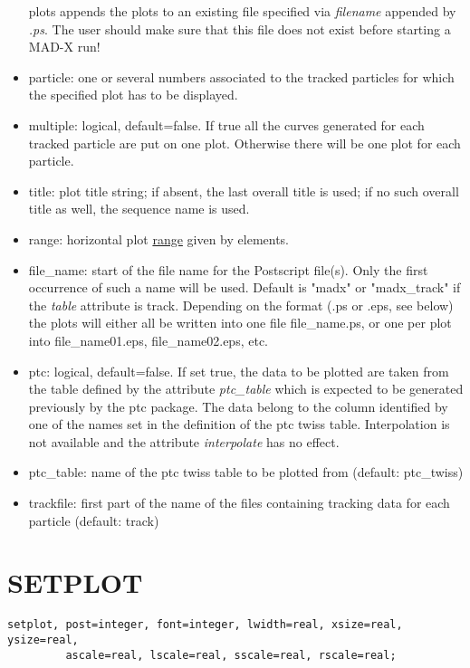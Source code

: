 \begin{itemize}
     plots appends the plots to an existing file specified via
     \textit{filename} appended by \textit{.ps}. The user should make
     sure that this file does not exist before starting a MAD-X run! 
   \item particle: one or several numbers associated to the tracked
     particles for which the specified plot has to be displayed.  
   \item multiple: logical, default=false. If true all the curves
     generated for each tracked particle are put on one plot. Otherwise
     there will be one plot for each particle.   
   \item title: plot title string; if absent, the last overall title is
     used; if no such overall title as well, the sequence name is used.   
   \item range: horizontal plot
     \href{../Introduction/ranges.html}{range} given by elements.  
   \item file\_name: start of the file name for the Postscript
     file(s). Only the first occurrence of such a name will be
     used. Default is "madx" or "madx\_track" if the \textit{table}
     attribute is track.  Depending on the format (.ps or .eps, see
     below) the plots will either all be written into one file
     file\_name.ps, or one per plot into file\_name01.eps,
     file\_name02.eps, etc.   
   \item ptc: logical, default=false. If set true, the data to be
     plotted are taken from the table defined by the attribute
     \textit{ptc\_table} which is expected to be generated previously by
     the ptc package. The data belong to the column identified by one of
     the names set in the definition of the ptc twiss
     table. Interpolation is not available and the attribute
     \textit{interpolate} has no effect.   
   \item ptc\_table: name of the ptc twiss table to be plotted from
     (default: ptc\_twiss)  
   \item trackfile: first part of the name of the files containing
     tracking data for each particle (default: track)  
\end{itemize}


\section{SETPLOT}
\begin{verbatim}
setplot, post=integer, font=integer, lwidth=real, xsize=real, ysize=real,
         ascale=real, lscale=real, sscale=real, rscale=real;
\end{verbatim} 

